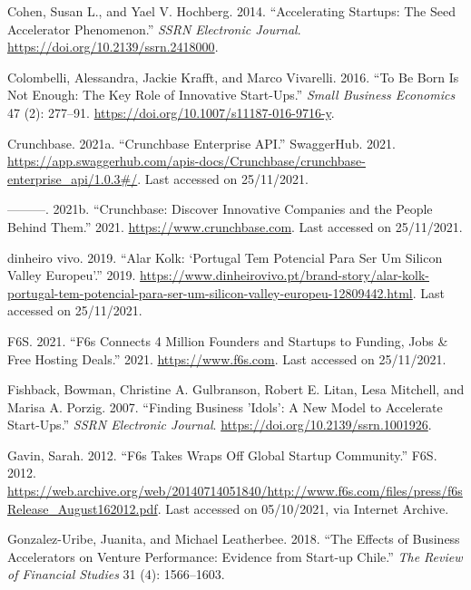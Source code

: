 \documentclass[
  12pt,
]{article}
\newlength{\cslhangindent}
\newlength{\cslentryspacingunit} %
\newenvironment{CSLReferences}[2] %
 {%
  \setlength{\parindent}{0pt}
  \ifodd #1
  \let\oldpar\par
  \def\par{\hangindent=\cslhangindent\oldpar}
  \fi
  \setlength{\parskip}{#2\cslentryspacingunit}
 }%
 {}
\begin{document}
\begin{CSLReferences}{1}{0}
\leavevmode{}%
Cohen, Susan L., and Yael V. Hochberg. 2014. {``Accelerating Startups: The Seed Accelerator Phenomenon.''} \emph{SSRN Electronic Journal}. \url{https://doi.org/10.2139/ssrn.2418000}.

\leavevmode{}%
Colombelli, Alessandra, Jackie Krafft, and Marco Vivarelli. 2016. {``To Be Born Is Not Enough: The Key Role of Innovative Start-Ups.''} \emph{Small Business Economics} 47 (2): 277--91. \url{https://doi.org/10.1007/s11187-016-9716-y}.

\leavevmode{}%
Crunchbase. 2021a. {``Crunchbase Enterprise API.''} {SwaggerHub}. 2021. \url{https://app.swaggerhub.com/apis-docs/Crunchbase/crunchbase-enterprise_api/1.0.3\#/}. Last accessed on 25/11/2021.

\leavevmode{}%
---------. 2021b. {``Crunchbase: Discover Innovative Companies and the People Behind Them.''} 2021. \url{https://www.crunchbase.com}. Last accessed on 25/11/2021.

\leavevmode{}%
dinheiro vivo. 2019. {``Alar Kolk: {`Portugal Tem Potencial Para Ser Um Silicon Valley Europeu'}.''} 2019. \url{https://www.dinheirovivo.pt/brand-story/alar-kolk-portugal-tem-potencial-para-ser-um-silicon-valley-europeu-12809442.html}. Last accessed on 25/11/2021.

\leavevmode{}%
F6S. 2021. {``F6s Connects 4 Million Founders and Startups to Funding, Jobs \& Free Hosting Deals.''} 2021. \url{https://www.f6s.com}. Last accessed on 25/11/2021.

\leavevmode{}%
Fishback, Bowman, Christine A. Gulbranson, Robert E. Litan, Lesa Mitchell, and Marisa A. Porzig. 2007. {``Finding Business 'Idols': A New Model to Accelerate Start-Ups.''} \emph{SSRN Electronic Journal}. \url{https://doi.org/10.2139/ssrn.1001926}.

\leavevmode{}%
Gavin, Sarah. 2012. {``F6s Takes Wraps Off Global Startup Community.''} {F6S}. 2012. \url{https://web.archive.org/web/20140714051840/http://www.f6s.com/files/press/f6sRelease_August162012.pdf}. Last accessed on 05/10/2021, via Internet Archive.

\leavevmode{}%
Gonzalez-Uribe, Juanita, and Michael Leatherbee. 2018. {``The Effects of Business Accelerators on Venture Performance: Evidence from Start-up Chile.''} \emph{The Review of Financial Studies} 31 (4): 1566--1603.


\end{CSLReferences}
\end{document}
